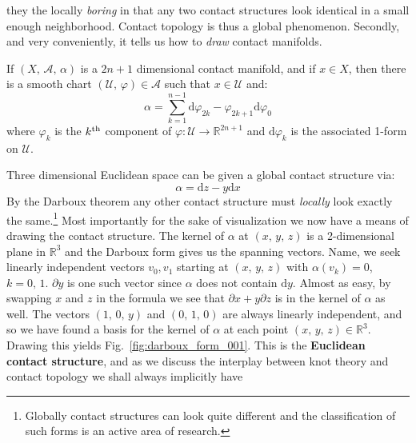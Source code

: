     they the locally \textit{boring} in that any two contact structures look
    identical in a small enough neighborhood. Contact topology is thus a global
    phenomenon. Secondly, and very conveniently, it tells us how to
    \textit{draw} contact manifolds.
    \begin{theorem}
        If $(X,\,\mathcal{A},\,\alpha)$ is a $2n+1$ dimensional
        contact manifold, and if $x\in{X}$, then there is a smooth chart
        $(\mathcal{U},\,\varphi)\in\mathcal{A}$ such that $x\in\mathcal{U}$
        and:
        \begin{equation}
            \alpha=
            \sum_{k=1}^{n-1}
            \textrm{d}\varphi_{2k}-\varphi_{2k+1}\textrm{d}\varphi_{0}
        \end{equation}
        where $\varphi_{k}$ is the $k^{\small\textrm{th}}$ component of
        $\varphi:\mathcal{U}\rightarrow\mathbb{R}^{2n+1}$ and
        $\textrm{d}\varphi_{k}$ is the associated 1-form on $\mathcal{U}$.
    \end{theorem}
    Three dimensional Euclidean space can be given a global contact structure
    via:
    \begin{equation}
        \label{eqn:euclidean_contact_form}
        \alpha=\textrm{d}z-y\textrm{d}x
    \end{equation}
    By the Darboux theorem any other
    contact structure must \textit{locally} look exactly the same.\footnote{%
        Globally contact structures can look quite different and the
        classification of such forms is an active area of research.
    }
    Most importantly for the sake of visualization we now have a means of
    drawing the contact structure. The kernel of $\alpha$ at $(x,\,y,\,z)$ is a
    2-dimensional plane in $\mathbb{R}^{3}$ and the Darboux form gives us the
    spanning vectors. Name, we seek linearly independent vectors $v_{0},v_{1}$
    starting at $(x,\,y,\,z)$ with $\alpha(v_{k})=0$, $k=0,\,1$.
    $\partial{y}$ is one such vector since
    $\alpha$ does not contain $\textrm{d}y$. Almost as easy, by swapping $x$
    and $z$ in the formula we see that $\partial{x}+y\partial{z}$ is in the
    kernel of $\alpha$ as well. The vectors $(1,\,0,\,y)$ and $(0,\,1,\,0)$
    are always linearly independent, and so we have found a basis for the
    kernel of $\alpha$ at each point $(x,\,y,\,z)\in\mathbb{R}^{3}$.
    Drawing this yields Fig.~\ref{fig:darboux_form_001}. This is the
    \textbf{Euclidean contact structure}, and as we discuss the interplay
    between knot theory and contact topology we shall always implicitly have
